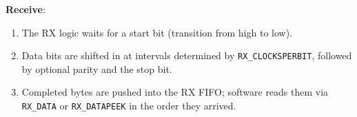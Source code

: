 \noindent
\textbf{Receive}:
\begin{enumerate}
  \item The RX logic waits for a start bit (transition from high to low).
  \item Data bits are shifted in at intervals determined by \texttt{RX\_CLOCKSPERBIT}, followed by optional parity and the stop bit.
  \item Completed bytes are pushed into the RX FIFO; software reads them via \texttt{RX\_DATA} or \texttt{RX\_DATAPEEK} in the order they arrived.
\end{enumerate}
